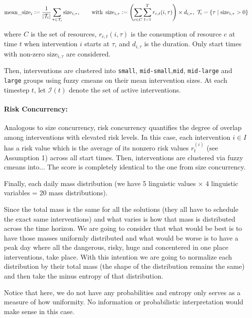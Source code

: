 \[
    \text{mean\_size}_i \mathrel{\mathop:}= \frac{1}{|\mathcal{T}_i|} \sum_{\tau\in \mathcal{T}_i} \text{size}_{i,\tau},
    \qquad \text{with }\,
    \text{size}_{i,\tau} \mathrel{\mathop:}= \left(\sum_{c \in C} \sum_{t=1}^{T} r_{c,t}(i,\tau)\right) \times d_{i,\tau}, \,\, \mathcal{T}_i = \{ \tau \mid \text{size}_{i,\tau} > 0 \}
\]

where \(C\) is the set of resources, \(r_{c,t}(i,\tau)\) is the consumption of resource \(c\) at time \(t\) when intervention \(i\) starts at \(\tau\), and \(d_{i,\tau}\) is the duration. Only start times with non-zero \(\text{size}_{i,\tau}\) are considered. 


Then, interventions are clustered into \texttt{small}, \texttt{mid-small},\texttt{mid}, \texttt{mid-large} and \texttt{large} groups using fuzzy cmeans on their mean intervention sizes. At each timestep \(t\), let \(\mathcal{I}(t)\) denote the set of active interventions. 

\paragraph{Risk Concurrency:} Analogous to size concurrency, risk concurrency quantifies the degree of overlap among interventions with elevated risk levels. In this case, each intervention \(i\in I\) has a risk value which is the average of its nonzero risk values $r_t^{(i)}$ (see Assumption 1) across all start times. Then, interventions are clustered via fuzzy cmeans into... The score is completely identical to the one from size concurrency.




Finally, each daily mass distribution (we have 5 linguistic values $\times$ 4 linguistic variables = 20 mass distributions). 

Since the total mass is the same for all the solutions (they all have to schedule the exact same interventions) and what varies is how that mass is distributed across the time horizon. We are going to consider that what would be best is to have those masses uniformly distributed and what would be worse is to have a peak day where all the dangerous, risky, huge and concentered in one place interventions, take place. With this intention we are going to normalize each distribution by their total mass (the shape of the distribution remains the same) and then take the minus entropy of that distribution.

Notice that here, we do not have any probabilities and entropy only serves as a measure of how uniformity. No information or probabilistic interpretation would make sense in this case.

